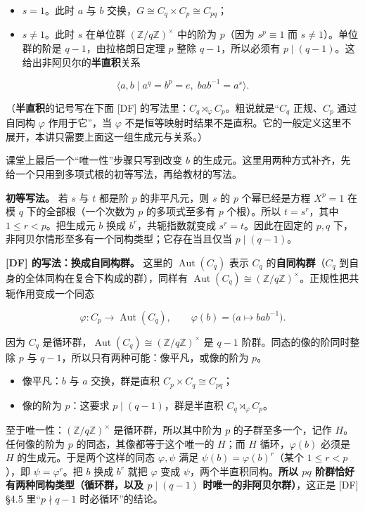 \begin{itemize}
\item $s=1$。此时 $a$ 与 $b$ 交换，$G\cong C_q\times C_p\cong C_{pq}$；
\item $s\ne1$。此时 $s$ 在单位群 $(\mathbb Z/q\mathbb Z)^\times$ 中的阶为 $p$（因为 $s^p\equiv1$ 而 $s\ne1$）。单位群的阶是 $q-1$，由拉格朗日定理 $p$ 整除 $q-1$，所以必须有 $p\mid(q-1)$。这给出非阿贝尔的\textbf{半直积}关系
\end{itemize}

\[
  \langle a,b\mid a^q=b^p=e,\;bab^{-1}=a^s\rangle.
\]

  （\textbf{半直积}的记号写在下面 [DF] 的写法里：$C_q\rtimes_\varphi C_p$。粗说就是“$C_q$ 正规、$C_p$ 通过自同构 $\varphi$ 作用于它”，当 $\varphi$ 不是恒等映射时结果不是直积。它的一般定义这里不展开，本讲只需要上面这一组生成元与关系。）

课堂上最后一个“唯一性”步骤只写到改变 $b$ 的生成元。这里用两种方式补齐，先给一个只用到多项式根的初等写法，再给教材的写法。

\textbf{初等写法。} 若 $s$ 与 $t$ 都是阶 $p$ 的非平凡元，则 $s$ 的 $p$ 个幂已经是方程 $X^p=1$ 在模 $q$ 下的全部根（一个次数为 $p$ 的多项式至多有 $p$ 个根）。所以 $t=s^r$，其中 $1\le r<p$。把生成元 $b$ 换成 $b^r$，共轭指数就变成 $s^r=t$。因此在固定的 $p,q$ 下，非阿贝尔情形至多有一个同构类型；它存在当且仅当 $p\mid(q-1)$。

\textbf{[DF] 的写法：换成自同构群。} 这里的 $\operatorname{Aut}(C_q)$ 表示 $C_q$ 的\textbf{自同构群}（$C_q$ 到自身的全体同构在复合下构成的群），同样有 $\operatorname{Aut}(C_q)\cong(\mathbb Z/q\mathbb Z)^\times$。正规性把共轭作用变成一个同态

\[
\varphi:C_p\longrightarrow\operatorname{Aut}(C_q),\qquad \varphi(b)=\bigl(a\mapsto bab^{-1}\bigr).
\]

因为 $C_q$ 是循环群，$\operatorname{Aut}(C_q)\cong(\mathbb Z/q\mathbb Z)^\times$ 是 $q-1$ 阶群。同态的像的阶同时整除 $p$ 与 $q-1$，所以只有两种可能：像平凡，或像的阶为 $p$。

\begin{itemize}
\item 像平凡：$b$ 与 $a$ 交换，群是直积 $C_p\times C_q\cong C_{pq}$；
\item 像的阶为 $p$：这要求 $p\mid(q-1)$，群是半直积 $C_q\rtimes_\varphi C_p$。
\end{itemize}


至于唯一性：$(\mathbb Z/q\mathbb Z)^\times$ 是循环群，所以其中阶为 $p$ 的子群至多一个，记作 $H$。任何像的阶为 $p$ 的同态，其像都等于这个唯一的 $H$；而 $H$ 循环，$\varphi(b)$ 必须是 $H$ 的生成元。于是两个这样的同态 $\varphi,\psi$ 满足 $\psi(b)=\varphi(b)^r$（某个 $1\le r<p$），即 $\psi=\varphi^r$。把 $b$ 换成 $b^r$ 就把 $\varphi$ 变成 $\psi$，两个半直积同构。\textbf{所以 $pq$ 阶群恰好有两种同构类型（循环群，以及 $p\mid(q-1)$ 时唯一的非阿贝尔群）}，这正是 [DF] §4.5 里“$p\nmid q-1$ 时必循环”的结论。


